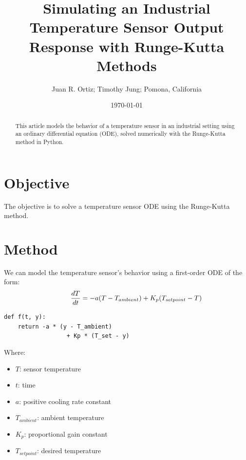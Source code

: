 \documentclass[letterpaper,twocolumn,fleqn]{article}
\title{ Simulating an Industrial Temperature Sensor Output Response with Runge-Kutta Methods}
\author{ Juan R. Ortiz; Timothy Jung; Pomona, California}
\date{\today} %
\begin{document}
 
\maketitle 
\thispagestyle{empty} %

\begin{abstract}
This article models the behavior of a temperature sensor in an industrial setting using an ordinary differential equation (ODE), solved numerically with the Runge-Kutta method in Python.
\end{abstract}

\section{Objective}
\label{sec:intro}
The objective is to solve a temperature sensor ODE using the Runge-Kutta method.

\section{Method}
We can model the temperature sensor's behavior using a first-order ODE of the form:
\[\hspace{0.4in}
\frac{dT}{dt} = -a(T - T_{ambient}) + K_{p}(T_{setpoint} - T)
\]

\begin{center}
\begin{minipage}{0.75\linewidth} %
\begin{verbatim}
def f(t, y):
    return -a * (y - T_ambient) 
                  + Kp * (T_set - y)
\end{verbatim}
\end{minipage}
\end{center}

\noindent Where:

\begin{itemize}
    \item $T$: sensor temperature
    \item $t$: time
    \item $a$: positive cooling rate constant
    \item $T_{ambient}$: ambient temperature
    \item $K_{p}$: proportional gain constant
    \item $T_{setpoint}$: desired temperature
\end{itemize}
\end{document}
